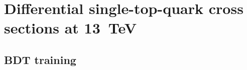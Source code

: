 \chapter{Differential single-top-quark cross sections at 13~TeV}

\section{BDT training}
\label{sec:diff13-bdt}